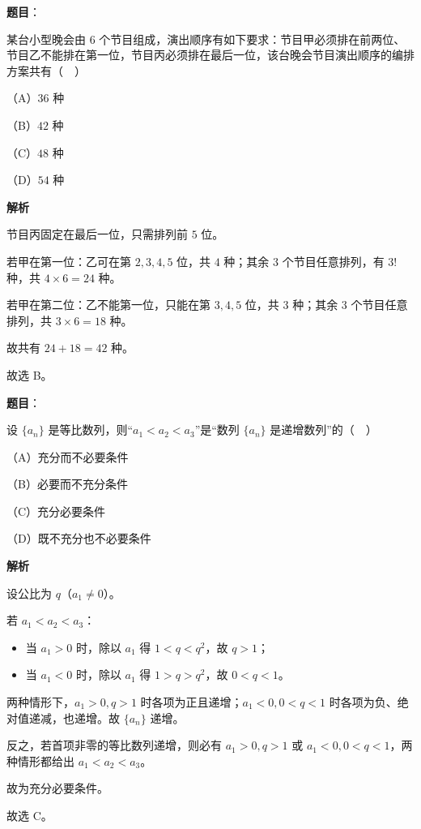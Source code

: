 \begin{answer}

\textbf{题目}：

某台小型晚会由 $6$ 个节目组成，演出顺序有如下要求：节目甲必须排在前两位、节目乙不能排在第一位，节目丙必须排在最后一位，该台晚会节目演出顺序的编排方案共有（　）

（A）$36$ 种

（B）$42$ 种

（C）$48$ 种

（D）$54$ 种

\textbf{解析}

节目丙固定在最后一位，只需排列前 $5$ 位。

若甲在第一位：乙可在第 $2,3,4,5$ 位，共 $4$ 种；其余 $3$ 个节目任意排列，有 $3!$ 种，共 $4\times6=24$ 种。

若甲在第二位：乙不能第一位，只能在第 $3,4,5$ 位，共 $3$ 种；其余 $3$ 个节目任意排列，共 $3\times6=18$ 种。

故共有 $24+18=42$ 种。

故选 B。


\end{answer}
\begin{answer}

\textbf{题目}：

设 $\{a_n\}$ 是等比数列，则“$a_1<a_2<a_3$”是“数列 $\{a_n\}$ 是递增数列”的（　）

（A）充分而不必要条件

（B）必要而不充分条件

（C）充分必要条件

（D）既不充分也不必要条件

\textbf{解析}

设公比为 $q$（$a_1\neq0$）。

若 $a_1<a_2<a_3$：

\begin{itemize}
\item 当 $a_1>0$ 时，除以 $a_1$ 得 $1<q<q^2$，故 $q>1$；
\item 当 $a_1<0$ 时，除以 $a_1$ 得 $1>q>q^2$，故 $0<q<1$。
\end{itemize}

两种情形下，$a_1>0,q>1$ 时各项为正且递增；$a_1<0,0<q<1$ 时各项为负、绝对值递减，也递增。故 $\{a_n\}$ 递增。

反之，若首项非零的等比数列递增，则必有 $a_1>0,q>1$ 或 $a_1<0,0<q<1$，两种情形都给出 $a_1<a_2<a_3$。

故为充分必要条件。

故选 C。


\end{answer}

